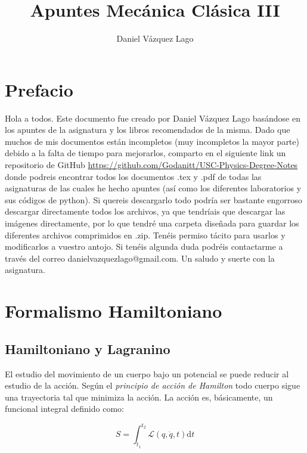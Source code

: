 \documentclass[12pt,a4paper]{article}
\title{Apuntes Mecánica Clásica III}
\author{Daniel Vázquez Lago}
\numberwithin{equation}{section}
\numberwithin{figure}{section}
\newcommand{\D}{\mathrm{d}}
\begin{document}
\maketitle

\newpage

\tableofcontents

\newpage

\section*{Prefacio}

Hola a todos. Este documento fue creado por Daniel Vázquez Lago basándose en los apuntes de la asignatura y los libros recomendados de la misma. Dado que muchos de mis documentos están incompletos (muy incompletos la mayor parte) debido a la falta de tiempo para mejorarlos, comparto en el siguiente link un repositorio de GitHub \url{https://github.com/Godanitt/USC-Physics-Degree-Notes} donde podreis encontrar todos los documentos .tex y .pdf de todas las asignaturas de las cuales he hecho apuntes (así como los diferentes laboratorios y sus códigos de python). Si quereis descargarlo todo podría ser bastante engorroso descargar directamente todos los archivos, ya que tendríais que descargar las imágenes directamente, por lo que tendré una carpeta diseñada para guardar los diferentes archivos comprimidos en .zip. Tenéis permiso tácito para usarlos y modificarlos a vuestro antojo. Si tenéis algunda duda podréis contactarme a través del correo danielvazquezlago@gmail.com. Un saludo y suerte con la asignatura.

\newpage

\section{Formalismo Hamiltoniano}

\subsection{Hamiltoniano y Lagranino}

El estudio del movimiento de un cuerpo bajo un potencial se puede reducir al estudio de la acción. Según el \textit{principio de acción de Hamilton} todo cuerpo sigue una trayectoria tal que minimiza la acción. La acción es, básicamente, un funcional integral definido como:

\begin{equation}
S = \int_{t_1}^{t_2} \mathcal{L} (q, \dot{q}, t) \D t
\end{equation}
\end{document}
